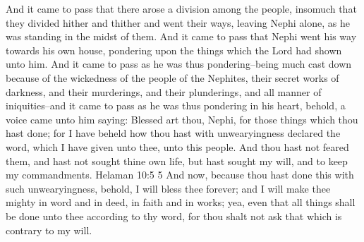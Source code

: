 \bchapter
\bverse \iffalse And it came to pass that there arose a division among the people, insomuch that they divided hither and thither and went their ways, leaving Nephi alone, as he was standing in the midst of them. \fi
And it came to pass that there arose a division among the people, insomuch that they divided hither and thither and went their ways, leaving Nephi alone, as he was standing in the midst of them.
\bverse \iffalse And it came to pass that Nephi went his way towards his own house, pondering upon the things which the Lord had shown unto him. \fi
And it came to pass that Nephi went his way towards his own house, pondering upon the things which the Lord had shown unto him.
\bverse \iffalse And it came to pass as he was thus pondering--being much cast down because of the wickedness of the people of the Nephites, their secret works of darkness, and their murderings, and their plunderings, and all manner of iniquities--and it came to pass as he was thus pondering in his heart, behold, a voice came unto him saying: \fi
And it came to pass as he was thus pondering--being much cast down because of the wickedness of the people of the Nephites, their secret works of darkness, and their murderings, and their plunderings, and all manner of iniquities--and it came to pass as he was thus pondering in his heart, behold, a voice came unto him saying:
\bverse \iffalse Blessed art thou, Nephi, for those things which thou hast done; for I have beheld how thou hast with unwearyingness declared the word, which I have given unto thee, unto this people. And thou hast not feared them, and hast not sought thine own life, but hast sought my will, and to keep my commandments.  Helaman 10:5 5 And now, because thou hast done this with such unwearyingness, behold, I will bless thee forever; and I will make thee mighty in word and in deed, in faith and in works; yea, even that all things shall be done unto thee according to thy word, for thou shalt not ask that which is contrary to my will. \fi
Blessed art thou, Nephi, for those things which thou hast done; for I have beheld how thou hast with unwearyingness declared the word, which I have given unto thee, unto this people. And thou hast not feared them, and hast not sought thine own life, but hast sought my will, and to keep my commandments.  Helaman 10:5 5 And now, because thou hast done this with such unwearyingness, behold, I will bless thee forever; and I will make thee mighty in word and in deed, in faith and in works; yea, even that all things shall be done unto thee according to thy word, for thou shalt not ask that which is contrary to my will.

